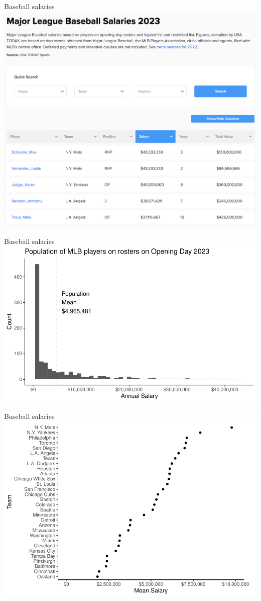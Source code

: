 \documentclass{beamer}
\newcommand\bref[2]{\href{#1}{\color{blue}{#2}}}
\begin{document}
\begin{frame}{Baseball salaries}
\includegraphics[width = .6\textwidth]{baseball_source}\\
\bref{https://databases.usatoday.com/major-league-baseball-salaries-2023/}{databases.usatoday.com/major-league-baseball-salaries-2023/}
\end{frame}

\begin{frame}{Baseball salaries}
\includegraphics[width = \textwidth]{baseball_histogram}
\end{frame}

\begin{frame}{Baseball salaries}
\includegraphics[width = \textwidth]{all_team_mean}
\end{frame}
\end{document}
